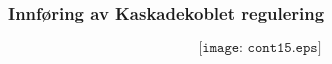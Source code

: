 \documentclass{beamer}
\begin{document}

\begin{frame}
	\frametitle{Innføring av Kaskadekoblet regulering}

	
$$\texttt{[image: cont15.eps]}$$

\end{frame}







\end{document}
